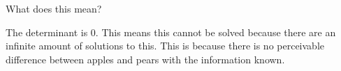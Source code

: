 What does this mean?

\begin{solution}
The determinant is 0. This means this cannot be solved because there are an infinite amount of solutions to this. This is because there is no perceivable difference between apples and pears with the information known.
\end{solution}